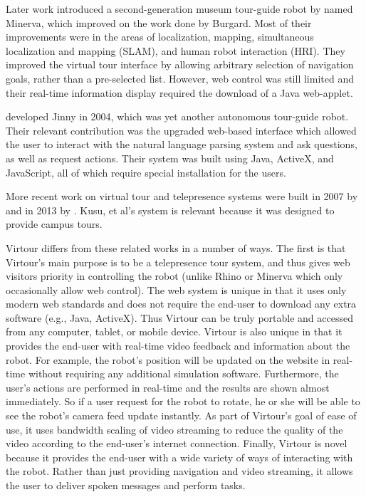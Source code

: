\documentclass[
  oneside,
  11pt, a4paper,
  footinclude=true,
  headinclude=true,
  cleardoublepage=empty
]{article}
\begin{document}
Later work introduced a second-generation museum tour-guide robot by
\citet{thrun1999} named Minerva, which improved on the work done by Burgard.
Most of their improvements were in the areas of localization, mapping,
simultaneous localization and mapping (SLAM), and human robot interaction
(HRI). They improved the virtual tour interface by allowing arbitrary selection
of navigation goals, rather than a pre-selected list. However, web control was
still limited and their real-time information display required the download of
a Java web-applet.

\citet{kim2004} developed Jinny in 2004, which was yet another autonomous
tour-guide robot. Their relevant contribution was the upgraded web-based
interface which allowed the user to interact with the natural language parsing
system and ask questions, as well as request actions. Their system was built
using Java, ActiveX, and JavaScript, all of which require special installation
for the users.

More recent work on virtual tour and telepresence systems were built in 2007 by
\citet{michaud2007} and in 2013 by \citet{kusu2013}. Kusu, et al's system is
relevant because it was designed to provide campus tours.

Virtour differs from these related works in a number of ways. The first is that
Virtour's main purpose is to be a telepresence tour system, and thus gives web
visitors priority in controlling the robot (unlike Rhino or Minerva which only
occasionally allow web control). The web system is unique in that it uses only
modern web standards and does not require the end-user to download any extra
software (e.g., Java, ActiveX). Thus Virtour can be truly portable and accessed
from any computer, tablet, or mobile device. Virtour is also unique in that it
provides the end-user with real-time video feedback and information about the
robot. For example, the robot's position will be updated on the website in
real-time without requiring any additional simulation software. Furthermore,
the user's actions are performed in real-time and the results are shown almost
immediately. So if a user request for the robot to rotate, he or she will be
able to see the robot's camera feed update instantly. As part of Virtour's
goal of ease of use, it uses bandwidth scaling of video streaming to reduce the
quality of the video according to the end-user's internet connection. Finally,
Virtour is novel because it provides the end-user with a wide variety of ways
of interacting with the robot. Rather than just providing navigation and video
streaming, it allows the user to deliver spoken messages and perform tasks.
\end{document}
